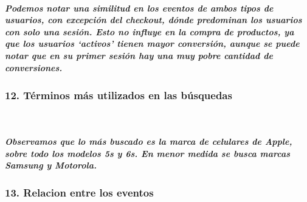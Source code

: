 \documentclass[11pt]{article}
\begin{document}
    \hypertarget{podemos-notar-una-similitud-en-los-eventos-de-ambos-tipos-de-usuarios-con-excepciuxf3n-del-checkout-duxf3nde-predominan-los-usuarios-con-solo-una-sesiuxf3n.-esto-no-influye-en-la-compra-de-productos-ya-que-los-usuarios-activos-tienen-mayor-conversiuxf3n-aunque-se-puede-notar-que-en-su-primer-sesiuxf3n-hay-una-muy-pobre-cantidad-de-conversiones.}{%
\subparagraph{Podemos notar una similitud en los eventos de ambos tipos
de usuarios, con excepción del checkout, dónde predominan los usuarios
con solo una sesión. Esto no influye en la compra de productos, ya que
los usuarios `activos' tienen mayor conversión, aunque se puede notar
que en su primer sesión hay una muy pobre cantidad de
conversiones.}\label{podemos-notar-una-similitud-en-los-eventos-de-ambos-tipos-de-usuarios-con-excepciuxf3n-del-checkout-duxf3nde-predominan-los-usuarios-con-solo-una-sesiuxf3n.-esto-no-influye-en-la-compra-de-productos-ya-que-los-usuarios-activos-tienen-mayor-conversiuxf3n-aunque-se-puede-notar-que-en-su-primer-sesiuxf3n-hay-una-muy-pobre-cantidad-de-conversiones.}}

    \hypertarget{tuxe9rminos-muxe1s-utilizados-en-las-buxfasquedas}{%
\subsubsection{12. Términos más utilizados en las
búsquedas}\label{tuxe9rminos-muxe1s-utilizados-en-las-buxfasquedas}}

    \begin{center}
    \end{center}
    { \hspace*{\fill} \\}
    
    \hypertarget{observamos-que-lo-muxe1s-buscado-es-la-marca-de-celulares-de-apple-sobre-todo-los-modelos-5s-y-6s.-en-menor-medida-se-busca-marcas-samsung-y-motorola.}{%
\subparagraph{Observamos que lo más buscado es la marca de celulares de
Apple, sobre todo los modelos 5s y 6s. En menor medida se busca marcas
Samsung y
Motorola.}\label{observamos-que-lo-muxe1s-buscado-es-la-marca-de-celulares-de-apple-sobre-todo-los-modelos-5s-y-6s.-en-menor-medida-se-busca-marcas-samsung-y-motorola.}}

    \hypertarget{relacion-entre-los-eventos}{%
\subsubsection{13. Relacion entre los
eventos}\label{relacion-entre-los-eventos}}

    \begin{center}
    \end{center}
    { \hspace*{\fill} \\}
    

    
    
    
    
\end{document}
